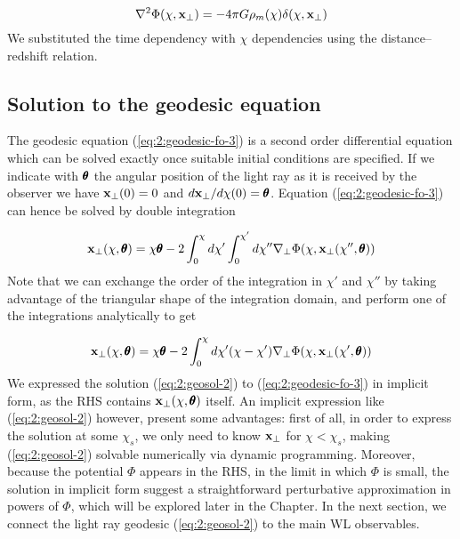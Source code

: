 \begin{equation}
\label{eq:2:poisson}
\nabla^2\Phi(\chi,\mathbf{x}_\perp) = -4\pi G\rho_m(\chi)\delta(\chi,\mathbf{x}_\perp)
\end{equation}  
%
We substituted the time dependency with $\chi$ dependencies using the distance--redshift relation. 

\subsection{Solution to the geodesic equation}
The geodesic equation (\ref{eq:2:geodesic-fo-3}) is a second order differential equation which can be solved exactly once suitable initial conditions are specified. If we indicate with $\pmb{\theta}$ the angular position of the light ray as it is received by the observer we have $\mathbf{x}_\perp(0)=0$ and $d\mathbf{x}_\perp /d\chi(0)=\pmb{\theta}$. Equation (\ref{eq:2:geodesic-fo-3}) can hence be solved by double integration

\begin{equation}
\label{eq:2:geosol-1}
\mathbf{x}_\perp(\chi,\pmb{\theta}) = \chi\pmb{\theta} - 2\int_0^\chi d\chi'\int_0^{\chi'}d\chi'' \nabla_\perp\Phi(\chi,\mathbf{x}_\perp(\chi'',\pmb{\theta}))
\end{equation} 
%
Note that we can exchange the order of the integration in $\chi'$ and $\chi''$ by taking advantage of the triangular shape of the integration domain, and perform one of the integrations analytically to get

\begin{equation}
\label{eq:2:geosol-2}
\mathbf{x}_\perp(\chi,\pmb{\theta}) = \chi\pmb{\theta} - 2\int_0^\chi d\chi'(\chi-\chi')\nabla_\perp\Phi(\chi,\mathbf{x}_\perp(\chi',\pmb{\theta}))
\end{equation} 
%
We expressed the solution (\ref{eq:2:geosol-2}) to (\ref{eq:2:geodesic-fo-3}) in implicit form, as the RHS contains $\mathbf{x}_\perp(\chi,\pmb{\theta})$ itself. An implicit expression like (\ref{eq:2:geosol-2}) however, present some advantages: first of all, in order to express the solution at some $\chi_s$, we only need to know $\mathbf{x}_\perp$ for $\chi<\chi_s$, making (\ref{eq:2:geosol-2}) solvable numerically via dynamic programming. Moreover, because the potential $\Phi$ appears in the RHS, in the limit in which $\Phi$ is small, the solution in implicit form suggest a straightforward perturbative approximation in powers of $\Phi$, which will be explored later in the Chapter. In the next section, we connect the light ray geodesic (\ref{eq:2:geosol-2}) to the main WL observables.  




